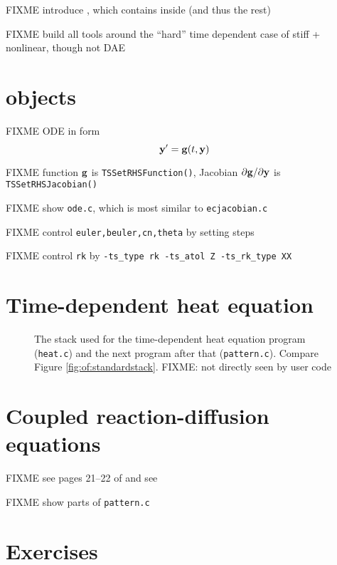 
FIXME introduce \pTS, which contains \pSNES inside (and thus the rest)

FIXME build all tools around the ``hard'' time dependent case of stiff + nonlinear, though not DAE

\section{\PETSc \pTS objects}

FIXME ODE in form
    $$\mathbf{y}' = \mathbf{g}(t,\mathbf{y})$$

FIXME function $\mathbf{g}$ is \texttt{TSSetRHSFunction()}, Jacobian $\partial \mathbf{g}/\partial \mathbf{y}$ is \texttt{TSSetRHSJacobian()}

FIXME show \texttt{ode.c}, which is most similar to \texttt{ecjacobian.c}

FIXME control \texttt{euler,beuler,cn,theta} by setting steps

FIXME control \texttt{rk} by \texttt{-ts\_type rk -ts\_atol Z -ts\_rk\_type XX}

\section{Time-dependent heat equation}

\begin{figure}
\caption{The \PETSc stack used for the time-dependent heat equation program (\texttt{heat.c}) and the next program after that (\texttt{pattern.c}).  Compare Figure \ref{fig:of:standardstack}.  FIXME: \pSNES not directly seen by user code}
\label{fig:of:tsstack}
\end{figure}


\section{Coupled reaction-diffusion equations}

FIXME see pages 21--22 of \citep{HundsdorferVerwer2003} and see \citep{Pearson1993}

FIXME show parts of \texttt{pattern.c}


\section{Exercises}

